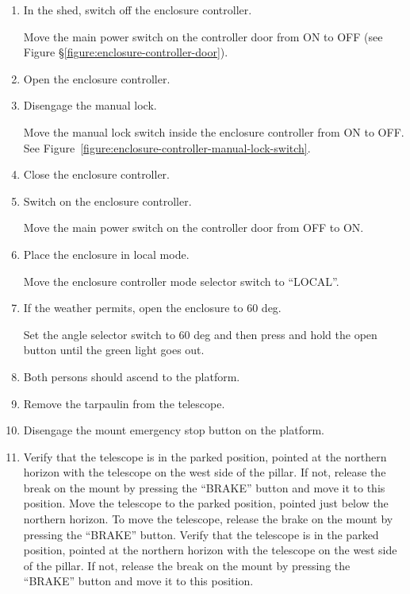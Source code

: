 \begin{enumerate}

    \item
        In the shed, switch off the enclosure controller.

        Move the main power switch on the controller door from ON to OFF (see Figure \S\ref{figure:enclosure-controller-door}).

    \item
        Open the enclosure controller.

    \item
        Disengage the manual lock.

        Move the manual lock switch inside the enclosure controller from ON to OFF. See Figure~\ref{figure:enclosure-controller-manual-lock-switch}.

    \item
        Close the enclosure controller.

    \item
        Switch on the enclosure controller.

        Move the main power switch on the controller door from OFF to ON.

    \item
        Place the enclosure in local mode.

        Move the enclosure controller mode selector switch to “LOCAL”.

    \item
        If the weather permits, open the enclosure to 60 deg.

        Set the angle selector switch to 60 deg and then press and hold the open button until the green light goes out.

    \item
        Both persons should ascend to the platform.

    \item
        Remove the tarpaulin from the telescope.

    \item Disengage the mount emergency stop button on the platform.

    \item
        \ifcoatli
        Verify that the telescope is in the parked position, pointed at the northern horizon with the telescope on the west side of the pillar. If not, release the break on the mount by pressing the “BRAKE” button and move it to this position.
        \fi
        \ifddoti
        Move the telescope to the parked position, pointed just below the northern horizon. To move the telescope, release the brake on the mount by pressing the “BRAKE” button.
        \fi
        \ifquetzalcoatl
        Verify that the telescope is in the parked position, pointed at the northern horizon with the telescope on the west side of the pillar. If not, release the break on the mount by pressing the “BRAKE” button and move it to this position.
        \fi


\end{enumerate}
